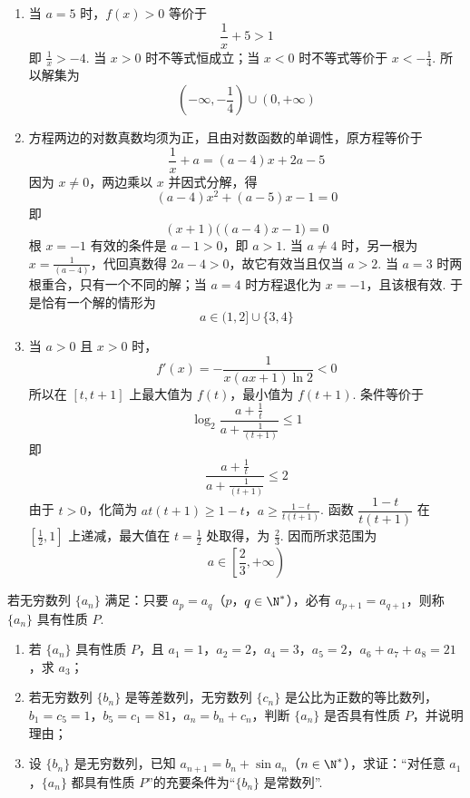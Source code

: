 \begin{solution}
\begin{enumerate}
\item 当 \(a=5\) 时，\(f(x)>0\) 等价于
\[
\frac1x+5>1
\]
即 \(\frac{1}{x}>-4\). 当 \(x>0\) 时不等式恒成立；当 \(x<0\) 时不等式等价于 \(x<-\frac{1}{4}\). 所以解集为
\[
\left(-\infty,-\frac14\right)\cup(0,+\infty)
\]
\item 方程两边的对数真数均须为正，且由对数函数的单调性，原方程等价于
\[
\frac1x+a=(a-4)x+2a-5
\]
因为 \(x\ne0\)，两边乘以 \(x\) 并因式分解，得
\[
(a-4)x^2+(a-5)x-1=0
\]
即
\[
(x+1)\bigl((a-4)x-1\bigr)=0
\]
根 \(x=-1\) 有效的条件是 \(a-1>0\)，即 \(a>1\). 当 \(a\ne4\) 时，另一根为 \(x=\frac{1}{(a-4)}\)，代回真数得 \(2a-4>0\)，故它有效当且仅当 \(a>2\). 当 \(a=3\) 时两根重合，只有一个不同的解；当 \(a=4\) 时方程退化为 \(x=-1\)，且该根有效. 于是恰有一个解的情形为
\[
a\in(1,2]\cup\{3,4\}
\]
\item 当 \(a>0\) 且 \(x>0\) 时，
\[
f'(x)=-\frac{1}{x(ax+1)\ln2}<0
\]
所以在 \([t,t+1]\) 上最大值为 \(f(t)\)，最小值为 \(f(t+1)\). 条件等价于
\[
\log_2\frac{a+\frac{1}{t}}{a+\frac{1}{(t+1)}}\le1
\]
即
\[
\frac{a+\frac{1}{t}}{a+\frac{1}{(t+1)}}\le2
\]
由于 \(t>0\)，化简为
\(a t(t+1)\ge1-t\)，\(a\ge\frac{1-t}{t(t+1)}\).
函数 \(\dfrac{1-t}{t(t+1)}\) 在 \([\frac{1}{2},1]\) 上递减，最大值在 \(t=\frac{1}{2}\) 处取得，为 \(\frac{2}{3}\). 因而所求范围为
\[
a\in\left[\frac23,+\infty\right)
\]
\end{enumerate}
\end{solution}

\begin{problem}

若无穷数列 \(\{a_n\}\) 满足：只要 \(a_p=a_q\)（\(p\)，\(q\in\N^*\)），必有 \(a_{p+1}=a_{q+1}\)，则称 \(\{a_n\}\) 具有性质 \(P\).

\begin{enumerate}
\item 若 \(\{a_n\}\) 具有性质 \(P\)，且 \(a_1=1\)，\(a_2=2\)，\(a_4=3\)，\(a_5=2\)，\(a_6+a_7+a_8=21\)，求 \(a_3\)；
\item 若无穷数列 \(\{b_n\}\) 是等差数列，无穷数列 \(\{c_n\}\) 是公比为正数的等比数列，\(b_1=c_5=1\)，\(b_5=c_1=81\)，\(a_n=b_n+c_n\)，判断 \(\{a_n\}\) 是否具有性质 \(P\)，并说明理由；
\item 设 \(\{b_n\}\) 是无穷数列，已知 \(a_{n+1}=b_n+\sin a_n\)（\(n\in\N^*\)），求证：“对任意 \(a_1\)，\(\{a_n\}\) 都具有性质 \(P\)”的充要条件为“\(\{b_n\}\) 是常数列”.
\end{enumerate}
\end{problem}

